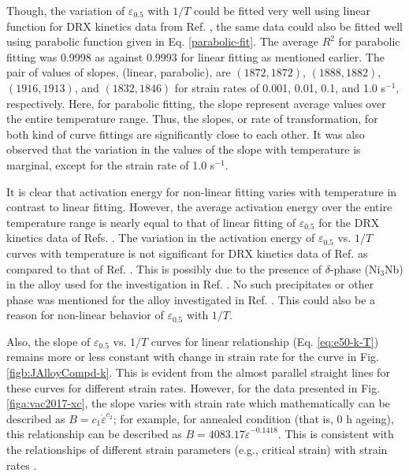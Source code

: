 \documentclass[a4paper, 11pt, dvipsnames]{article}
\begin{document}
Though, the variation of $\varepsilon_{0.5}$ with $1/T$ could be fitted very well using linear function for DRX kinetics data from Ref. \cite{Z1}, the same data could also be fitted well using parabolic function given in Eq. \eqref{parabolic-fit}. The average $R^2$ for parabolic fitting was 0.9998 as against 0.9993 for linear fitting as mentioned earlier. The pair of values of slopes, (linear, parabolic), are $(1872, 1872)$, $(1888, 1882)$, $(1916, 1913)$, and $(1832, 1846)$ for strain rates of 0.001, 0.01, 0.1, and 1.0 s$^{-1}$, respectively. Here, for parabolic fitting, the slope represent average values over the entire temperature range. Thus, the slopes, or rate of transformation, for both kind of curve fittings are significantly close to each other. It was also observed that the variation in the values of the slope with temperature is marginal, except for the strain rate of 1.0 s$^{-1}$. 

It is clear that activation energy for non-linear fitting varies with temperature in contrast to linear fitting. However, the average activation energy over the entire temperature range is nearly equal to that of linear fitting of $\varepsilon_{0.5}$ for the DRX kinetics data of Refs. \cite{X1, Z1}. The variation in the activation energy of $\varepsilon_{0.5}$ vs. $1/T$ curves with temperature is not significant for DRX kinetics data of Ref. \cite{Z1} as compared to that of Ref. \cite{X1}. This is possibly due to the presence of $\delta$-phase (Ni$_3$Nb) in the alloy used for the investigation in Ref. \cite{X1}. No such precipitates or other phase was mentioned for the alloy investigated in Ref. \cite{Z1}. This could also be a reason for non-linear behavior of $\varepsilon_{0.5}$ with $1/T$. 

Also, the slope of $\varepsilon_{0.5}$ vs. $1/T$ curves for linear relationship (Eq. \eqref{eq:e50-k-T}) remains more or less constant with change in strain rate for the curve in Fig. \ref{figb:JAlloyCompd-k}. This is evident from the almost parallel straight lines for these curves for different strain rates. However, for the data presented in Fig. \ref{figa:vac2017-xc}, the slope varies with strain rate which mathematically can be described as $B = c_1\dot{\varepsilon}^{c_2}$; for example, for annealed condition (that is, 0 h ageing), this relationship can be described as $B = 4083.17\dot{\varepsilon}^{-0.1418}$. This is consistent with the relationships of different strain parameters (e.g., critical strain) with strain rates \cite{X1, Z1}.
\end{document}
